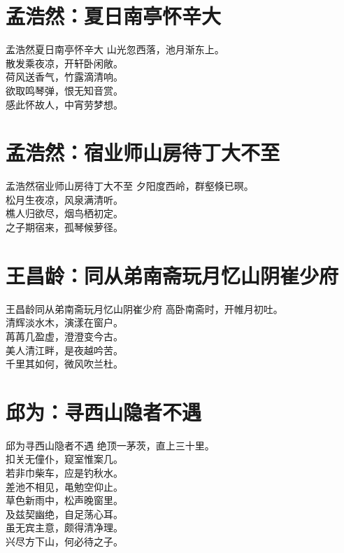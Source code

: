 \documentclass[12pt,oneside,a5paper]{book}
\begin{document}
\chapter{孟浩然：夏日南亭怀辛大}
\begin{poemzh}{孟浩然}{夏日南亭怀辛大}
山光忽西落，池月渐东上。\\
散发乘夜凉，开轩卧闲敞。\\
荷风送香气，竹露滴清响。\\
欲取鸣琴弹，恨无知音赏。\\
感此怀故人，中宵劳梦想。\\ 
\end{poemzh}

\chapter{孟浩然：宿业师山房待丁大不至}
\begin{poemzh}{孟浩然}{宿业师山房待丁大不至}
夕阳度西岭，群壑倏已暝。\\
松月生夜凉，风泉满清听。\\
樵人归欲尽，烟鸟栖初定。\\
之子期宿来，孤琴候萝径。\\ 
\end{poemzh}

\chapter{王昌龄：同从弟南斋玩月忆山阴崔少府}
\begin{poemzh}{王昌龄}{同从弟南斋玩月忆山阴崔少府}
高卧南斋时，开帷月初吐。\\
清辉淡水木，演漾在窗户。\\
苒苒几盈虚，澄澄变今古。\\
美人清江畔，是夜越吟苦。\\
千里其如何，微风吹兰杜。\\ 
\end{poemzh}

\chapter{邱为：寻西山隐者不遇}
\begin{poemzh}{邱为}{寻西山隐者不遇}
绝顶一茅茨，直上三十里。\\
扣关无僮仆，窥室惟案几。\\
若非巾柴车，应是钓秋水。\\
差池不相见，黾勉空仰止。\\
草色新雨中，松声晚窗里。\\
及兹契幽绝，自足荡心耳。\\
虽无宾主意，颇得清净理。\\
兴尽方下山，何必待之子。\\ 
\end{poemzh}
\end{document}
